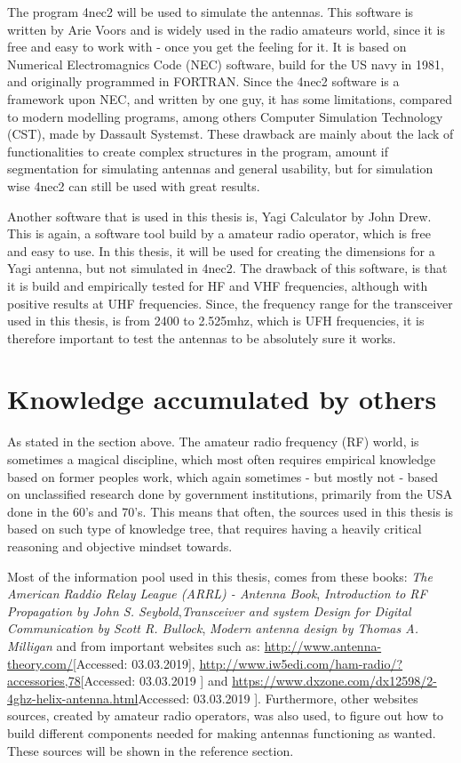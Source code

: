 The program 4nec2\cite{4nec2} will be used to simulate the antennas. This software is written by Arie Voors and is widely used in the radio amateurs world, since it is free and easy to work with - once you get the feeling for it. It is based on Numerical Electromagnics Code (NEC) software\cite{nec}, build for the US navy in 1981, and originally programmed in FORTRAN\cite{Fortran}. Since the 4nec2 software is a framework upon NEC, and written by one guy, it has some limitations, compared to modern modelling programs, among others Computer Simulation Technology (CST), made by Dassault Systemst\cite{Dassault}. These drawback are mainly about the lack of functionalities to create complex structures in the program, amount if segmentation for simulating antennas and general usability, but for simulation wise 4nec2 can still be used with great results. 

Another software that is used in this thesis is, Yagi Calculator by John Drew\cite{yagical}. This is again, a software tool build by a amateur radio operator, which is free and easy to use. In this thesis, it will be used for creating the dimensions for a Yagi antenna, but not simulated in 4nec2. The drawback of this software, is that it is build and empirically tested for HF and VHF frequencies, although with positive results at UHF frequencies. Since, the frequency range for the transceiver used in this thesis, is from 2400 to 2.525mhz, which is UFH frequencies, it is therefore important to test the antennas to be absolutely sure it works.  

\section{Knowledge accumulated by others}
As stated in the section above. The amateur radio frequency (RF) world, is sometimes a magical discipline, which most often requires empirical knowledge based on former peoples work, which again sometimes - but mostly not - based on unclassified research done by government institutions, primarily from the USA done in the 60's and 70's. This means that often, the sources used in this thesis is based on such type of knowledge tree, that requires having a heavily critical reasoning and objective mindset towards.

Most of the information pool used in this thesis, comes from these books: \textit{The American Raddio Relay League (ARRL) - Antenna Book}\cite{ARRL}, \textit{Introduction to RF Propagation by John S. Seybold}\cite{RFpropagation},\textit{Transceiver and system Design for Digital Communication by Scott R. Bullock}\cite{TransceiverBook}, \textit{Modern antenna design by Thomas A. Milligan}\cite{modernantenna} and from important websites such as: \url{http://www.antenna-theory.com/}[Accessed: 03.03.2019], \url{http://www.iw5edi.com/ham-radio/?accessories,78}[Accessed: 03.03.2019 ] and \url{	https://www.dxzone.com/dx12598/2-4ghz-helix-antenna.html}Accessed: 03.03.2019 ]. Furthermore, other websites sources, created by amateur radio operators, was also used, to figure out how to build different components needed for making  antennas functioning as wanted. These sources will be shown in the reference section.

